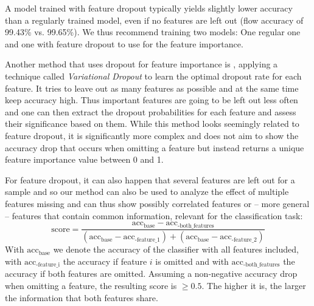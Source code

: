 \documentclass[conference]{IEEEtran}
\begin{document}
A model trained with feature dropout typically yields slightly lower accuracy than a regularly trained model, even if no features are left out (flow accuracy of 99.43\% vs. 99.65\%). We thus recommend training two models: One regular one and one with feature dropout to use for the feature importance.

Another method that uses dropout for feature importance is \cite{chang_dropout_2017}, applying a technique called \textit{Variational Dropout} to learn the optimal dropout rate for each feature. It tries to leave out as many features as possible and at the same time keep accuracy high. Thus important features are going to be left out less often and one can then extract the dropout probabilities for each feature and assess their significance based on them. %
While this method looks seemingly related to feature dropout, it is significantly more complex and does not aim to show the accuracy drop that occurs when omitting a feature but instead returns a unique feature importance value between 0 and 1. 

For feature dropout, it can also happen that several features are left out for a sample and so our method can also be used to analyze the effect of multiple features missing and can thus show possibly correlated features or -- more general -- features that contain common information, relevant for the classification task:
\begin{equation}
\text{score} = \frac{\text{acc}_{\text{base}}-\text{acc}_{\text{-both\_features}}}{\left(\text{acc}_{\text{base}}-\text{acc}_{\text{-feature\_1}}\right) + \left(\text{acc}_{\text{base}}-\text{acc}_{\text{-feature\_2}}\right)}
\end{equation}
With $\text{acc}_{\text{base}}$ we denote the accuracy of the classifier with all features included, with $\text{acc}_{\text{-feature\_i}}$ the accuracy if feature $i$ is omitted and with $\text{acc}_{\text{-both\_features}}$ the accuracy if both features are omitted. Assuming a non-negative accuracy drop when omitting a feature, the resulting score is $\ge 0.5$. The higher it is, the larger the information that both features share.
\end{document}
